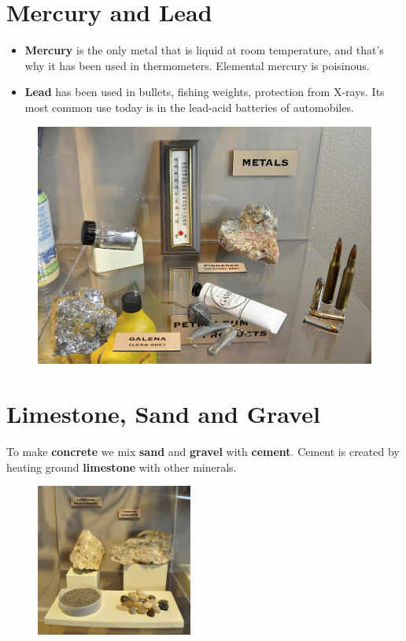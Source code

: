 \documentclass[12pt, letterpaper]{article}
\begin{document}
\section{Mercury and Lead}
	\begin{itemize}
		\item \textbf{Mercury} is the only metal that is liquid at room temperature, and that's why it has been used in thermometers. Elemental mercury is poisinous.
		\item \textbf{Lead} has been used in bullets, fishing weights, protection from X-rays. Its most common use today is in the lead-acid batteries of automobiles.  
	\end{itemize}
	
	\begin{figure}[h]
		\includegraphics{shelf10}
		\centering
	\end{figure}
	
\section{Limestone, Sand and Gravel}
	To make \textbf{concrete} we mix \textbf{sand} and \textbf{gravel} with \textbf{cement}. Cement is created by heating ground \textbf{limestone} with other minerals. 
	
	\begin{figure}[h]
		\includegraphics[height=5cm]{shelf11}
		\centering
	\end{figure}
\pagebreak
\end{document}
